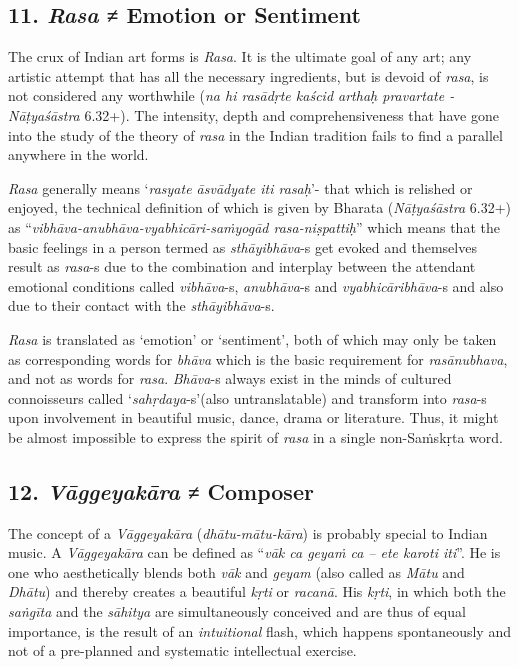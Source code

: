 \subsection*{11. \textit{Rasa} ≠ Emotion or Sentiment}

The crux of Indian art forms is \textit{Rasa}. It is the ultimate goal of any art; any artistic attempt that has all the necessary ingredients, but is devoid of \textit{rasa}, is not considered any worthwhile (\textit{na hi rasādṛte kaścid arthaḥ pravartate - Nāṭyaśāstra} 6.32+). The intensity, depth and comprehensiveness that have gone into the study of the theory of \textit{rasa} in the Indian tradition fails to find a parallel anywhere in the world.

\textit{Rasa} generally means ‘\textit{rasyate āsvādyate iti rasaḥ}’- that which is relished or enjoyed, the technical definition of which is given by Bharata (\textit{Nāṭyaśāstra} 6.32+) as “\textit{vibhāva-anubhāva-vyabhicāri-saṁyogād rasa-niṣpattiḥ}” which means that the basic feelings in a person termed as \textit{sthāyibhāva}-s get evoked and themselves result as \textit{rasa}­-s due to the combination and interplay between the attendant emotional conditions called \textit{vibhāva}-s, \textit{anubhāva}-s and \textit{vyabhicāribhāva}-s and also due to their contact with the \textit{sthāyibhāva}-s.

\textit{Rasa} is translated as ‘emotion’ or ‘sentiment’, both of which may only be taken as corresponding words for \textit{bhāva} which is the basic requirement for \textit{rasānubhava}, and not as words for \textit{rasa}. \textit{Bhāva}-s always exist in the minds of cultured connoisseurs called ‘\textit{sahṛdaya}-s’\break (also untranslatable) and transform into \textit{rasa}-s upon involvement in beautiful music, dance, drama or literature. Thus, it might be almost impossible to express the spirit of \textit{rasa} in a single non-Saṁskṛta word.


\subsection*{12. \textit{Vāggeyakāra} ≠ Composer}

The concept of a \textit{Vāggeyakāra} (\textit{dhātu-mātu-kāra}) is probably special to Indian music. A \textit{Vāggeyakāra} can be defined as “\textit{vāk ca geyaṁ ca – ete karoti iti}”. He is one who aesthetically blends both \textit{vāk} and \textit{geyam} (also called as \textit{Mātu} and \textit{Dhātu}) and thereby creates a beautiful \textit{kṛti} or \textit{racanā}. His \textit{kṛti}, in which both the \textit{saṅgīta} and the \textit{sāhitya} are simultaneously conceived and are thus of equal importance, is the result of an \textit{intuitional} flash, which happens spontaneously and not of a pre-planned and systematic intellectual exercise.

